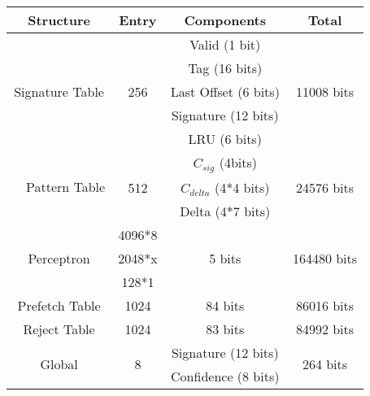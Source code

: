 \begin{table}[h]
\begin{adjustwidth}{-0.5cm}{}
    \centering
    \begin{tabular}{|c|c|c|c|}
    \hline
        \textbf{Structure} &
        \textbf{Entry} &
        \textbf{Components} &
        \textbf{Total} \\
    \hline
        \multirow{5}{1.5cm}{Signature Table} &      & Valid (1 bit)        &             \\
                                             &      & Tag (16 bits)        &             \\
                                             & 256  & Last Offset (6 bits) & 11008 bits  \\  
                                             &      & Signature (12 bits)  &             \\
                                             &      & LRU (6 bits)         &             \\
    \hline
        \multirow{3}{2cm}{~~Pattern Table} &      & $C_{sig}$ (4bits)      &               \\
                                             & 512  & $C_{delta}$ (4*4 bits) & 24576 bits    \\
                                             &      & Delta (4*7 bits)       &               \\
    \hline
        \multirow{3}{1.5cm}{Perceptron\newline}     & 4096*8    &            &              \\
        \multirow{2}{0.9cm}{Weights}                 & 2048*x    & 5 bits     & 164480 bits  \\
                                                    & 128*1     &            &              \\
    \hline
        Prefetch Table\footnotemark[1]             & 1024      & 84 bits    & 86016 bits   \\
    \hline
        Reject Table\footnotemark[2]               & 1024      & 83 bits    & 84992 bits   \\
    \hline
        \multirow{4}{1cm}{Global\newline\newline}   & \multirow{4}{0.2cm}{8} & Signature (12 bits)  & \multirow{4}{1.1cm}{264 bits} \\
        \multirow{3}{1.1cm}{History\newline}        &                        & Confidence (8 bits)  &                               \\

\end{tabular}
\end{adjustwidth}
\end{table}
